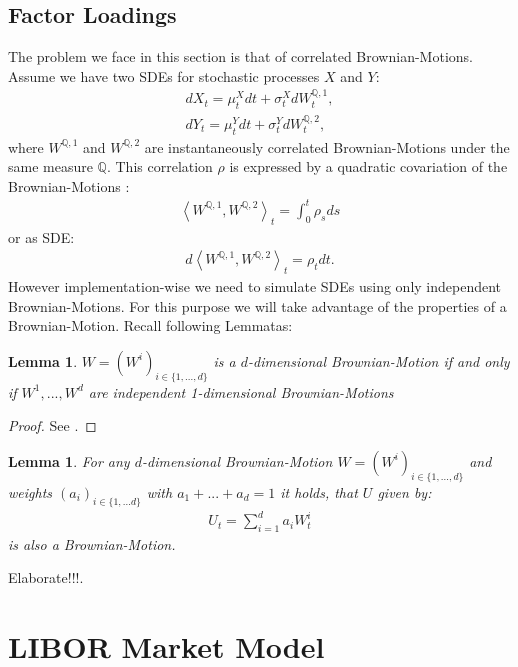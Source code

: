 \documentclass[12pt]{article}
\newtheorem{lemma}[theorem]{Lemma}
\begin{document}
	
	\subsection{Factor Loadings}\label{sec::FactorLoading}
	The problem we face in this section is that of correlated Brownian-Motions. \\
	Assume we have two SDEs for stochastic processes $X$ and $Y$:	
	\begin{align*}
		dX_t = \mu^X_t dt + \sigma^X_t dW^{\mathbb{Q}, 1}_t,\\
		dY_t = \mu^Y_t dt + \sigma^Y_t dW^{\mathbb{Q}, 2}_t,
	\end{align*}
	where $W^{\mathbb{Q}, 1}$ and $W^{\mathbb{Q}, 2}$ are instantaneously correlated Brownian-Motions under the same measure $\mathbb{Q}$. This correlation $\rho$ is expressed by a quadratic covariation of the Brownian-Motions \cite{FriesBook}:
	\begin{align*}
		\left\langle W^{\mathbb{Q}, 1}, W^{\mathbb{Q}, 2} \right\rangle_t = \int_{0}^{t}\rho_s ds
	\end{align*}
	or as SDE:
	\begin{align*}
		d\left\langle W^{\mathbb{Q}, 1}, W^{\mathbb{Q}, 2} \right\rangle_t = \rho_t dt.
	\end{align*}
	However implementation-wise we need to simulate SDEs using only independent Brownian-Motions. For this purpose we will take advantage of the properties of a Brownian-Motion. Recall following Lemmatas:
	\begin{lemma}
		$W = (W^i)_{i\in\{1, ..., d\}}$ is a $d$-dimensional Brownian-Motion if and only if $W^1, ..., W^d$ are independent 1-dimensional Brownian-Motions
	\end{lemma}
	\begin{proof}
		See \cite{fima2Lecture}.
	\end{proof}
	\begin{lemma}
		For any $d$-dimensional Brownian-Motion $W = (W^i)_{i\in\{1, ..., d\}}$ and weights $(a_i)_{i\in\{1,...d\}}$ with $a_1 + ... + a_d = 1$ it holds, that $U$ given by:
		\begin{align*}
			U_t = \sum_{i=1}^{d}a_iW^i_t
		\end{align*}
		is also a Brownian-Motion.
	\end{lemma} 
	\color{red}Elaborate!!!\color{black}. 
	
	
	\pagebreak
	\section{LIBOR Market Model}\label{sec::LIBORModel}
	
\end{document}
